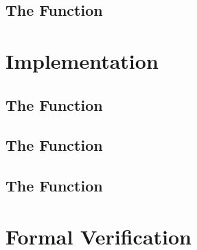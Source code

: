 \subsection{The Function }

\section{Implementation}
\subsection{The Function \bitstreamread}
\subsection{The Function }
\subsection{The Function }

\section{Formal Verification}
\subsection{}
\subsection{}

